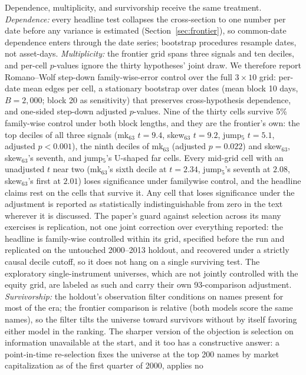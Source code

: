 \documentclass[11pt]{article}
\theoremstyle{remark}
\begin{document}
Dependence, multiplicity, and survivorship receive the same
treatment. \emph{Dependence:} every headline test collapses the cross-section
to one number per date before any variance is estimated
(Section~\ref{sec:frontier}), so common-date dependence enters
through the date series; bootstrap procedures resample dates, not
asset-days. \emph{Multiplicity:} the frontier grid spans three
signals and ten deciles, and per-cell $p$-values ignore the thirty
hypotheses' joint draw. We therefore report Romano--Wolf step-down
family-wise-error control over the full $3\times10$ grid: per-date
mean edges per cell, a stationary bootstrap over dates (mean block 10
days, $B=2{,}000$; block 20 as sensitivity) that preserves
cross-hypothesis dependence, and one-sided step-down adjusted
$p$-values.
Nine of the thirty cells survive 5\% family-wise control under both
block lengths, and they are the frontier's own: the top deciles of
all three signals (mk$_{63}$ $t=9.4$, skew$_{63}$ $t=9.2$, jump$_5$
$t=5.1$, adjusted $p<0.001$), the ninth deciles of mk$_{63}$
(adjusted $p=0.022$) and skew$_{63}$, skew$_{63}$'s seventh, and
jump$_5$'s U-shaped far cells. Every mid-grid cell with an unadjusted
$t$ near two (mk$_{63}$'s sixth decile at $t=2.34$, jump$_5$'s
seventh at $2.08$, skew$_{63}$'s first at $2.01$) loses
significance under familywise control, and the headline claims rest on
the cells that survive it. Any cell that loses significance under the
adjustment is reported as statistically indistinguishable from zero in
the text
wherever it is discussed. The paper's guard against selection across
its many exercises is replication, not one joint correction over
everything reported: the headline is family-wise controlled within its
grid, specified before the run and replicated on the untouched 2000--2013
holdout, and recovered under a strictly causal decile cutoff, so it
does not hang on a single surviving test. The exploratory
single-instrument universes, which are not jointly controlled with the
equity grid, are labeled as such and carry their own 93-comparison
adjustment. \emph{Survivorship:} the holdout's
observation filter conditions on names present for most of the era;
the frontier comparison is relative (both models score the same
names), so the filter tilts the universe toward survivors without
by itself favoring either model in the ranking. The sharper version
of the objection is selection on information unavailable at the
start, and it too has a constructive answer: a point-in-time
re-selection fixes the universe at the top 200 names by market
capitalization as of the first quarter of 2000, applies no
\end{document}
